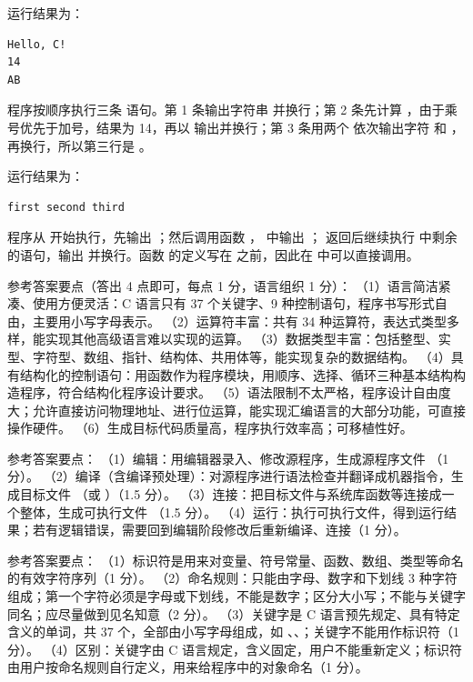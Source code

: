 \documentclass[a4paper,11pt]{article}
\begin{document}

\q 运行结果为：
\begin{lstlisting}
Hello, C!
14
AB
\end{lstlisting}
\begin{analysis}程序按顺序执行三条  语句。第 1 条输出字符串  并换行；第 2 条先计算 ，由于乘号优先于加号，结果为 14，再以  输出并换行；第 3 条用两个  依次输出字符  和 ，再换行，所以第三行是 。\end{analysis}

\q 运行结果为：
\begin{lstlisting}
first second third
\end{lstlisting}
\begin{analysis}程序从  开始执行，先输出 ；然后调用函数 ， 中输出 ； 返回后继续执行  中剩余的语句，输出  并换行。函数  的定义写在  之前，因此在  中可以直接调用。\end{analysis}


\q 参考答案要点（答出 4 点即可，每点 1 分，语言组织 1 分）：
（1）语言简洁紧凑、使用方便灵活：C 语言只有 37 个关键字、9 种控制语句，程序书写形式自由，主要用小写字母表示。
（2）运算符丰富：共有 34 种运算符，表达式类型多样，能实现其他高级语言难以实现的运算。
（3）数据类型丰富：包括整型、实型、字符型、数组、指针、结构体、共用体等，能实现复杂的数据结构。
（4）具有结构化的控制语句：用函数作为程序模块，用顺序、选择、循环三种基本结构构造程序，符合结构化程序设计要求。
（5）语法限制不太严格，程序设计自由度大；允许直接访问物理地址、进行位运算，能实现汇编语言的大部分功能，可直接操作硬件。
（6）生成目标代码质量高，程序执行效率高；可移植性好。

\q 参考答案要点：
（1）编辑：用编辑器录入、修改源程序，生成源程序文件 （1 分）。
（2）编译（含编译预处理）：对源程序进行语法检查并翻译成机器指令，生成目标文件 （或 ）（1.5 分）。
（3）连接：把目标文件与系统库函数等连接成一个整体，生成可执行文件 （1.5 分）。
（4）运行：执行可执行文件，得到运行结果；若有逻辑错误，需要回到编辑阶段修改后重新编译、连接（1 分）。

\q 参考答案要点：
（1）标识符是用来对变量、符号常量、函数、数组、类型等命名的有效字符序列（1 分）。
（2）命名规则：只能由字母、数字和下划线 3 种字符组成；第一个字符必须是字母或下划线，不能是数字；区分大小写；不能与关键字同名；应尽量做到见名知意（2 分）。
（3）关键字是 C 语言预先规定、具有特定含义的单词，共 37 个，全部由小写字母组成，如 、、；关键字不能用作标识符（1 分）。
（4）区别：关键字由 C 语言规定，含义固定，用户不能重新定义；标识符由用户按命名规则自行定义，用来给程序中的对象命名（1 分）。
\end{document}
